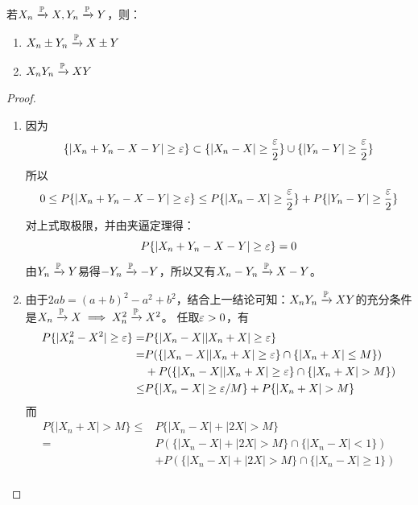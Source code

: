 \begin{lemma}\label{lem:sum_product_CP}
    若$X_n \xrightarrow{\P} X, Y_n \xrightarrow{\P} Y$，则：
    \begin{enumerate}
        \item$X_n \pm Y_n \xrightarrow{\P} X \pm Y$
        \item$X_n Y_n \xrightarrow{\P} XY$
    \end{enumerate}
\end{lemma}
\begin{proof}
    \begin{enumerate}
        \item 因为
              \[ \{ \left\vert X_n+Y_n-X-Y \right\vert \ge \e \} \subset \{ \left\vert X_n-X \right\vert \ge \frac{\e}{2} \} \cup \{ \left\vert Y_n-Y \right\vert \ge \frac{\e}{2} \} \]
              所以
              \[ 0 \le P\{ \left\vert X_n+Y_n-X-Y \right\vert \ge \e \} \le P\{ \left\vert X_n-X \right\vert \ge \frac{\e}{2} \} + P\{ \left\vert Y_n-Y \right\vert \ge \frac{\e}{2} \} \]
              对上式取极限，并由夹逼定理得：
              \[ P\{ \left\vert X_n+Y_n-X-Y \right\vert \ge \e \}=0 \]
              由$Y_n \xrightarrow{\P} Y$易得$-Y_n \xrightarrow{\P} -Y$，所以又有$X_n - Y_n \xrightarrow{\P} X - Y$。
        \item 由于$2ab=(a+b)^2-a^2+b^2$，结合上一结论可知：$X_n Y_n \xrightarrow{\P} XY$的充分条件是$X_n \xrightarrow{\P} X \implies X_n^2 \xrightarrow{\P} X^2$。
              任取$\e >0$，有
              \begin{align*}
                  P\{|X_n^2-X^2| \ge \e \}= & P\{|X_n-X||X_n+X| \ge \e \}                         \\
                  =                         & P(\{|X_n-X||X_n+X| \ge \e \} \cap\{|X_n+X| \le M\}) \\
                                            & + P(\{|X_n-X||X_n+X| \ge \e \} \cap \{|X_n+X|>M\})  \\
                  \le                       & P\{|X_n-X| \ge \e / M\}+P\{|X_n+X|>M\}
              \end{align*}
              而
              \begin{align*}
                  P\{|X_n+X|>M\} \le & P\{|X_n-X|+|2X|>M\}                           \\
                  =                  & P(\{|X_n-X|+|2X|>M\} \cap\{|X_n-X|<1\})       \\
                                     & + P(\{|X_n-X|+|2X|>M\} \cap\{|X_n-X| \ge 1\}) \\

\end{align*}
\end{enumerate}
\end{proof}
